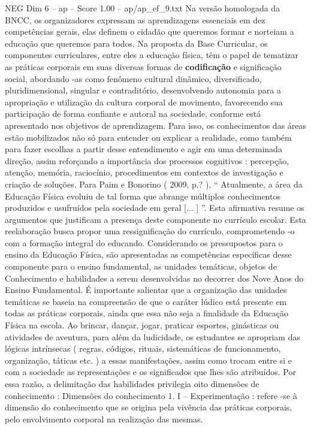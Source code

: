 \begin{textsample}{NEG Dim 6 – ap – Score 1.00 – ap/ap\_ef\_9.txt}
Na versão homologada da BNCC, os organizadores expressam as aprendizagens essenciais em dez competências gerais, elas definem o cidadão que queremos formar e norteiam a educação que queremos para todos.
Na proposta da Base Curricular, os componentes curriculares, entre eles a educação física, têm o papel de tematizar as práticas corporais em suas diversas formas de \textbf{codificação} e significação social, abordando -as como fenômeno cultural dinâmico, diversificado, pluridimensional, singular e contraditório, desenvolvendo autonomia para a apropriação e utilização da cultura corporal de movimento, favorecendo sua participação de forma confiante e autoral na sociedade, conforme está apresentado nos objetivos de aprendizagem.
Para isso, os conhecimentos das áreas estão mobilizados não só para entender ou explicar a realidade, como também para fazer escolhas a partir desse entendimento e agir em uma determinada direção, assim reforçando a importância dos processos cognitivos : percepção, atenção, memória, raciocínio, procedimentos em contextos de investigação e criação de soluções.
Para Paim e Bonorino ( 2009, p.? ), “ Atualmente, a área da Educação Física evoluiu de tal forma que abrange múltiplos conhecimentos produzidos e usufruídos pela sociedade em geral [... ] ”.
Esta afirmativa resume os argumentos que justificam a presença deste componente no currículo escolar.
Esta reelaboração busca propor uma ressignificação do currículo, comprometendo -o com a formação integral do educando.
Considerando os pressupostos para o ensino da Educação Física, são apresentadas as competências específicas desse componente para o ensino fundamental, as unidades temáticas, objetos de Conhecimento e habilidades a serem desenvolvidas no decorrer dos Nove Anos do Ensino Fundamental.
É importante salientar que a organização das unidades temáticas se baseia na compreensão de que o caráter lúdico está presente em todas as práticas corporais, ainda que essa não seja a finalidade da Educação Física na escola.
Ao brincar, dançar, jogar, praticar esportes, ginásticas ou atividades de aventura, para além da ludicidade, os estudantes se apropriam das lógicas intrínsecas ( regras, códigos, rituais, sistemáticas de funcionamento, organização, táticas etc. ) a essas manifestações, assim como trocam entre si e com a sociedade as representações e os significados que lhes são atribuídos.
Por essa razão, a delimitação das habilidades privilegia oito dimensões de conhecimento : Dimensões do conhecimento 1.
I – Experimentação : refere -se à dimensão do conhecimento que se origina pela vivência das práticas corporais, pelo envolvimento corporal na realização das mesmas.

\end{textsample}
